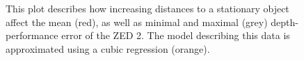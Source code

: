 \begin{figure}[h]
\begin{center}
		\caption{
			This plot describes how increasing distances to a stationary object affect the mean (red), as well as minimal and maximal (grey) depth-performance error of the ZED 2. The model describing this data is approximated using a cubic regression (orange).
		}
		\label{plot:zed2Benchmark}
	\end{center}
\end{figure}
